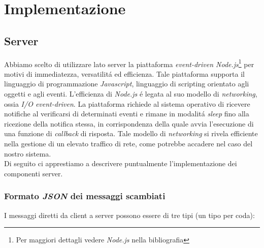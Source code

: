 \documentclass{article}
\begin{document}
\newpage
\section{Implementazione}

\subsection{Server}
Abbiamo scelto di utilizzare lato server la piattaforma \textit{event-driven Node.js}\footnote{Per maggiori dettagli vedere \textit{Node.js} nella bibliografia} per motivi di immediatezza, versatilit\'a  ed efficienza. Tale piattaforma supporta il linguaggio di programmazione \textit{Javascript}, linguaggio di scripting orientato agli oggetti e agli eventi. L'efficienza di \textit{Node.js} \'e legata al suo modello di \textit{networking}, ossia \textit{I/O event-driven}. La piattaforma richiede al sistema operativo di ricevere notifiche al verificarsi di determinati eventi e rimane in modalit\'a \textit{sleep} fino alla ricezione della notifica stessa, in corrispondenza della quale avvia l'esecuzione di una funzione di \textit{callback} di risposta. Tale modello di \textit{networking} si rivela efficiente nella gestione di un elevato traffico di rete, come potrebbe accadere nel caso del nostro sistema.
\\
Di seguito ci apprestiamo a descrivere puntualmente l'implementazione dei componenti server.

\subsubsection{Formato \textit{JSON} dei messaggi scambiati}

I messaggi diretti da client a server possono essere di tre tipi (un tipo per coda):
\end{document}
